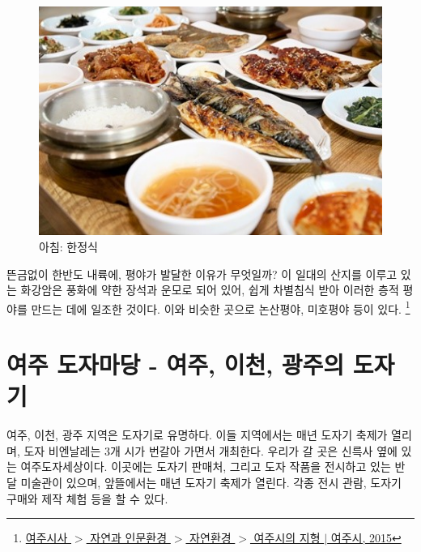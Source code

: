 
\begin{figure}[ht]
    \centering
    \includegraphics[width=.6\textwidth]{img/한정식.jpg}
    \caption{아침: 한정식 \protect\footnotemark}
    \label{fig:my_labe2}
\end{figure}
뜬금없이 한반도 내륙에, 평야가 발달한 이유가 무엇일까?
이 일대의 산지를 이루고 있는 화강암은 풍화에 약한 장석과 운모로 되어 있어, 
쉽게 차별침식 받아 이러한 층적 평야를 만드는 데에 일조한 것이다.
이와 비슷한 곳으로 논산평야, 미호평야 등이 있다.
\footnote{ \href{https://www.yeoju.go.kr/history/main.jsp}{여주시사 $>$ 자연과 인문환경 $>$ 자연환경 $>$ 여주시의 지형 $|$ 여주시, 2015}}

\section{여주 도자마당 - 여주, 이천, 광주의 도자기}
여주, 이천, 광주 지역은 도자기로 유명하다. 이들 지역에서는 매년 도자기 축제가 열리며, 도자 비엔날레는 3개 시가 번갈아 가면서 개최한다.
우리가 갈 곳은 신륵사 옆에 있는 여주도자세상이다.
이곳에는 도자기 판매처, 그리고 도자 작품을 전시하고 있는 반달 미술관이 있으며, 앞뜰에서는 매년 도자기 축제가 열린다. 
각종 전시 관람, 도자기 구매와 제작 체험 등을 할 수 있다.

